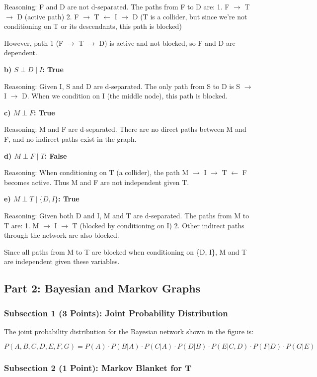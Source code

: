 \documentclass[conference]{IEEEtran}
\begin{document}
Reasoning: F and D are not d-separated. The paths from F to D are:
1. F $\rightarrow$ T $\rightarrow$ D (active path)
2. F $\rightarrow$ T $\leftarrow$ I $\rightarrow$ D (T is a collider, but since we're not conditioning on T or its descendants, this path is blocked)

However, path 1 (F $\rightarrow$ T $\rightarrow$ D) is active and not blocked, so F and D are dependent.

\textbf{b) $S \perp D \mid I$: True}

Reasoning: Given I, S and D are d-separated. The only path from S to D is S $\rightarrow$ I $\rightarrow$ D. When we condition on I (the middle node), this path is blocked.

\textbf{c) $M \perp F$: True}

Reasoning: M and F are d-separated. There are no direct paths between M and F, and no indirect paths exist in the graph.

\textbf{d) $M \perp F \mid T$: False}

Reasoning: When conditioning on T (a collider), the path M $\rightarrow$ I $\rightarrow$ T $\leftarrow$ F becomes active. Thus M and F are not independent given T.

\textbf{e) $M \perp T \mid \{D, I\}$: True}

Reasoning: Given both D and I, M and T are d-separated. The paths from M to T are:
1. M $\rightarrow$ I $\rightarrow$ T (blocked by conditioning on I)
2. Other indirect paths through the network are also blocked.

Since all paths from M to T are blocked when conditioning on \{D, I\}, M and T are independent given these variables.

\subsection{Part 2: Bayesian and Markov Graphs}

\subsubsection{Subsection 1 (3 Points): Joint Probability Distribution}

The joint probability distribution for the Bayesian network shown in the figure is:

\[P(A,B,C,D,E,F,G) = P(A) \cdot P(B|A) \cdot P(C|A) \cdot P(D|B) \cdot P(E|C,D) \cdot P(F|D) \cdot P(G|E)\]

\subsubsection{Subsection 2 (1 Point): Markov Blanket for T}
\end{document}
